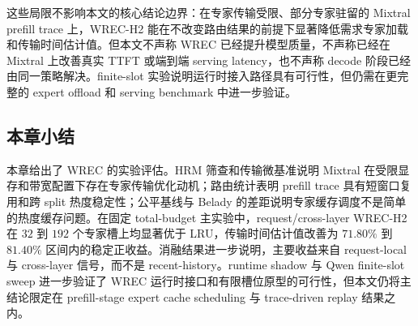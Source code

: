 这些局限不影响本文的核心结论边界：在专家传输受限、部分专家驻留的 Mixtral prefill trace 上，WREC-H2 能在不改变路由结果的前提下显著降低需求专家加载和传输时间估计值。但本文不声称 WREC 已经提升模型质量，不声称已经在 Mixtral 上改善真实 TTFT 或端到端 serving latency，也不声称 decode 阶段已经由同一策略解决。finite-slot 实验说明运行时接入路径具有可行性，但仍需在更完整的 expert offload 和 serving benchmark 中进一步验证。

\subsection{本章小结}

本章给出了 WREC 的实验评估。HRM 筛查和传输微基准说明 Mixtral 在受限显存和带宽配置下存在专家传输优化动机；路由统计表明 prefill trace 具有短窗口复用和跨 split 热度稳定性；公平基线与 Belady 的差距说明专家缓存调度不是简单的热度缓存问题。在固定 total-budget 主实验中，request/cross-layer WREC-H2 在 $32$ 到 $192$ 个专家槽上均显著优于 LRU，传输时间估计值改善为 $71.80\%$ 到 $81.40\%$ 区间内的稳定正收益。消融结果进一步说明，主要收益来自 request-local 与 cross-layer 信号，而不是 recent-history。runtime shadow 与 Qwen finite-slot sweep 进一步验证了 WREC 运行时接口和有限槽位原型的可行性，但本文仍将主结论限定在 prefill-stage expert cache scheduling 与 trace-driven replay 结果之内。
